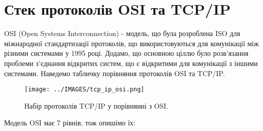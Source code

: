 \section{Стек протоколів OSI та TCP/IP}
OSI (Open Systems Interconnection) - модель, що була розроблена ISO для міжнародної стандартизації протоколів, що використовуються для комунікації між різними системами у 1995 році. Додамо, що основною ціллю було розв'язання проблеми з'єднання відкритих систем, що є відкритими для комунікації з іншими системами. Наведемо табличку порівняння протоколів OSI та TCP/IP.
\begin{figure}[ht]
        \centering
        \texttt{[image: ../IMAGES/tcp\_ip\_osi.png]}
        \caption{Набір протоколів TCP/IP у порівнянні з OSI.}
        \label{tcp_ip_protocols_suite}
\end{figure}
Модель OSI має 7 рівнів, тож опишімо їх:
